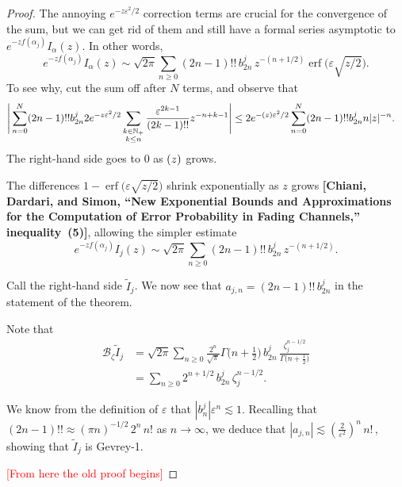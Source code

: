 \documentclass{article}
\let\Re\relax
\DeclareMathOperator{\Re}{Re}
\theoremstyle{definition}
\newcommand{\borel}{\mathcal{B}}
\begin{document}
\begin{proof}
The annoying $e^{-z\varepsilon^2/2}$ correction terms are crucial for the convergence of the sum, but we can get rid of them and still have a formal series asymptotic to $e^{-z f(\alpha_j)} I_\alpha(z)$. In other words,
\[ e^{-z f(\alpha_j)} I_\alpha(z) \sim \sqrt{2\pi} \sum_{n \ge 0} (2n-1)!!\,b_{2n}^j\,z^{-(n+1/2)} \operatorname{erf}\big(\varepsilon \sqrt{z/2}\big). \]
To see why, cut the sum off after $N$ terms, and observe that
\begin{align*}
  \Bigg | \sum_{n= 0}^N(2n-1)!! b_{2n}^j  2e^{-z\varepsilon^2/2} \sum_{\substack{k \in \mathbb{N}_+ \\ k \le n}} \frac{\varepsilon^{2k-1}}{(2k-1)!!} z^{-n+k-1} \Bigg | &\leq  2 e^{-\Re (z) \varepsilon^2/2} \sum_{n=0}^N(2n-1)!! b_{2n}^j n|z|^{-n}.
\end{align*}
The right-hand side goes to $0$ as $\Re(z)$ grows.

The differences $1 - \operatorname{erf}\big(\varepsilon \sqrt{z/2}\big)$ shrink exponentially as $z$ grows \textbf{[Chiani, Dardari, and Simon, ``New Exponential Bounds and Approximations
for the Computation of Error Probability in
Fading Channels,'' inequality~(5)]}, allowing the simpler estimate
\[ e^{-zf(\alpha_j)} I_j(z) \sim \sqrt{2\pi} \sum_{n \ge 0} (2n-1)!!\, b_{2n}^j \,z^{-(n+1/2)}. \] 

Call the right-hand side $\tilde{I}_j$. We now see that $a_{j,n} = (2n-1)!!\,b_{2n}^j$ in the statement of the theorem. %

Note that 
\begin{align*}
\borel_{\zeta} \tilde{I}_j & = \sqrt{2\pi} \sum_{n \ge 0} \frac{2^n}{\sqrt{\pi}} \Gamma\big(n+\tfrac{1}{2}\big)\,b_{2n}^j\,\frac{\zeta_j^{n-1/2}}{\Gamma\big(n+\tfrac{1}{2}\big)} \\
& = \sum_{n \ge 0} 2^{n+1/2}\,b_{2n}^j \,\zeta_j^{n-1/2}.
\end{align*}

We know from the definition of $\varepsilon$ that $\left|b_n^j\right| \varepsilon^n \lesssim 1$. Recalling that $(2n - 1)!! \approx (\pi n)^{-1/2}\,2^n\,n!$ as $n \to \infty$, we deduce that $|a_{j,n}| \lesssim \left(\tfrac{2}{\varepsilon^2}\right)^n\,n!\,$, showing that $\tilde{I}_j$ is Gevrey-1.

\textcolor{red}{[From here the old proof begins]}


\end{proof}
\end{document}

